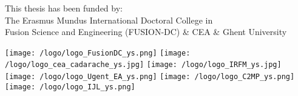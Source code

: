 \begin{titlepage}
\begin{center}
\begin{tabular}{lcl}
\hline
\end{tabular}

\vspace{1cm}

This thesis has been funded by: \\
The Erasmus Mundus International Doctoral College in \\
Fusion Science and Engineering (FUSION-DC) \& CEA \& Ghent University \\



\vspace{.7cm}



\texttt{[image: /logo/logo\_FusionDC\_ys.png]} \hspace{+0.1cm}
\texttt{[image: /logo/logo\_cea\_cadarache\_ys.jpg]} \hspace{+0.1cm}
\texttt{[image: /logo/logo\_IRFM\_ys.jpg]} \hspace{+0.1cm}
\texttt{[image: /logo/logo\_Ugent\_EA\_ys.png]} \hspace{+0.1cm}
\texttt{[image: /logo/logo\_C2MP\_ys.png]} \hspace{+0.1cm}
\texttt{[image: /logo/logo\_IJL\_ys.png]} \\

\end{center}


\end{titlepage}








